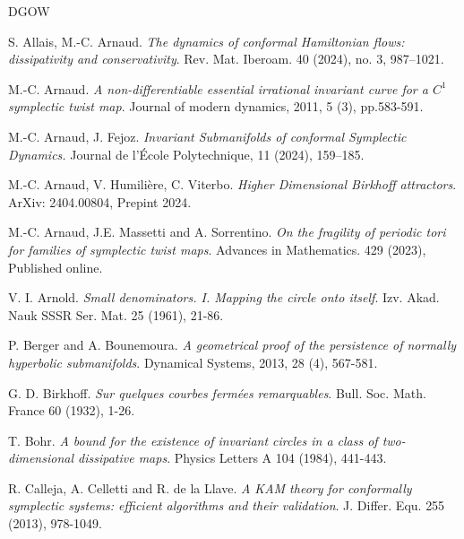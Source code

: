 \documentclass{amsart}
\theoremstyle{definition}
\begin{document}
\begin{thebibliography}{DGOW}
\renewcommand{\baselinestretch}{1.0}
\setlength\itemsep{-1pt}
\small


  S. Allais, M.-C. Arnaud.
{\it The dynamics of conformal Hamiltonian flows: dissipativity and conservativity}. Rev. Mat. Iberoam. 40 (2024), no. 3, 987--1021.



  M.-C. Arnaud.
{\it A non-differentiable essential irrational invariant curve
 for a $C^1$ symplectic twist map}. Journal of modern dynamics, 2011, 5 (3), pp.583-591.



 M.-C. Arnaud, J. Fejoz.  {\it Invariant Submanifolds of conformal Symplectic Dynamics.}  Journal de l'\'{E}cole Polytechnique, 11 (2024), 159--185.


 M.-C. Arnaud, V. Humili\`ere, C. Viterbo. {\it Higher Dimensional Birkhoff attractors}. ArXiv: 2404.00804, Prepint 2024.


 M.-C. Arnaud, J.E.  Massetti and A. Sorrentino.  {\it On the fragility of periodic tori for families of symplectic twist maps}.  Advances in Mathematics. {429} (2023), Published online.

  V. I. Arnold. {\it  Small denominators. I. Mapping the circle onto itself}.
Izv. Akad. Nauk SSSR Ser. Mat. 25 (1961), 21-86.

 P. Berger  and A. Bounemoura. {\it A geometrical proof of the persistence of normally hyperbolic submanifolds}. Dynamical Systems, 2013, 28 (4), 567-581.

 G. D. Birkhoff. {\it Sur quelques courbes ferm\'{e}es remarquables}. Bull. Soc. Math. France {60}
(1932), 1-26.



 T. Bohr. {\it A bound for the existence of invariant circles in a class of two-dimensional dissipative maps}. Physics Letters A {104}
(1984), 441-443.


 R. Calleja, A. Celletti and R. de la Llave. {\it A KAM theory for conformally symplectic systems: efficient
algorithms and their validation}. J. Differ. Equ. {255} (2013), 978-1049.



\end{thebibliography}
\end{document}
